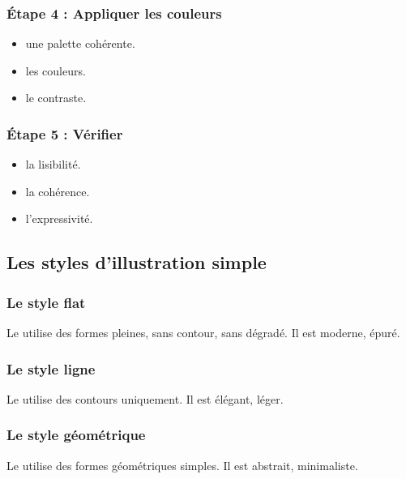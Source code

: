 \subsubsection{Étape 4 : Appliquer les couleurs}

\begin{itemize}
    \item {} une palette cohérente.
    \item {} les couleurs.
    \item {} le contraste.
\end{itemize}

\subsubsection{Étape 5 : Vérifier}

\begin{itemize}
    \item {} la lisibilité.
    \item {} la cohérence.
    \item {} l'expressivité.
\end{itemize}

\subsection{Les styles d'illustration simple}

\subsubsection{Le style flat}

Le  utilise des formes pleines, sans contour, sans dégradé. Il est moderne, épuré.

\subsubsection{Le style ligne}

Le  utilise des contours uniquement. Il est élégant, léger.

\subsubsection{Le style géométrique}

Le  utilise des formes géométriques simples. Il est abstrait, minimaliste.

